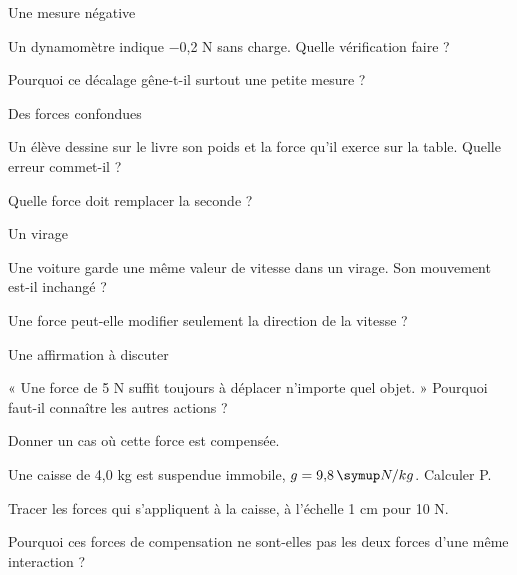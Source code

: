 \par\noindent\begin{minipage}{\linewidth}
\begin{exercice}[3]{Une mesure négative}
\begin{questions}
\item Un dynamomètre indique −0,2 N sans charge. Quelle vérification faire ?
\item Pourquoi ce décalage gêne-t-il surtout une petite mesure ?
\end{questions}
\end{exercice}
\end{minipage}
\par\noindent\begin{minipage}{\linewidth}
\begin{exercice}[3]{Des forces confondues}
\begin{questions}
\item Un élève dessine sur le livre son poids et la force qu’il exerce sur la table. Quelle erreur commet-il ?
\item Quelle force doit remplacer la seconde ?
\end{questions}
\end{exercice}
\end{minipage}
\par\noindent\begin{minipage}{\linewidth}
\begin{exercice}[3]{Un virage}
\begin{questions}
\item Une voiture garde une même valeur de vitesse dans un virage. Son mouvement est-il inchangé ?
\item Une force peut-elle modifier seulement la direction de la vitesse ?
\end{questions}
\end{exercice}
\end{minipage}
\par\noindent\begin{minipage}{\linewidth}
\begin{exercice}[3]{Une affirmation à discuter}
\begin{questions}
\item « Une force de 5 N suffit toujours à déplacer n’importe quel objet. » Pourquoi faut-il connaître les autres actions ?
\item Donner un cas où cette force est compensée.
\end{questions}
\end{exercice}
\end{minipage}
\label{defi-ex-9}
\begin{questions}
\item Une caisse de 4,0 kg est suspendue immobile, $g=9{,}8\unite{N/kg}$. Calculer P.
\item Tracer les forces qui s’appliquent à la caisse, à l’échelle 1 cm pour 10 N.
\item Pourquoi ces forces de compensation ne sont-elles pas les deux forces d’une même interaction ?
\end{questions}
\pcGrille

